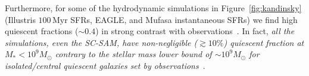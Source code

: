 \documentclass[preprint2,tighten]{aastex62}
\begin{document}
Furthermore, for some of the hydrodynamic simulations in Figure~\ref{fig:kandinsky}
(Illustris $100\,\mathrm{Myr}$ SFRs, EAGLE, and {\sc Mufasa} instantaneous SFRs)
we find high quiescent fractions (${\sim}0.4$) in strong contrast with 
observations~\citep{baldry2006,peng2010,hahn2015}. In fact, \emph{all the 
simulations, even the SC-SAM, have non-negligible (${\gtrsim}10\%$) quiescent 
fraction at $M_* < 10^9 M_\odot$ contrary to the stellar mass lower bound 
of ${\sim}10^9M_\odot$ for isolated/central quiescent galaxies set by 
observations}~\citep{geha2012}. 
\end{document}
